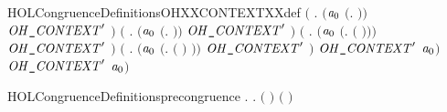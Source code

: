 \begin{SaveVerbatim}{HOLCongruenceDefinitionsOHXXCONTEXTXXdef}
                 \ensuremath{(}\HOLSymConst{\HOLTokenExists{}} . \ensuremath{(}\ensuremath{\HOLBoundVar{a}\sb{\mathrm{0}}} \HOLSymConst{\ensuremath{=}} \ensuremath{(}\HOLTokenLambda{}.   \HOLSymConst{\ensuremath{\mid}} \ensuremath{)}\ensuremath{)} \HOLSymConst{\HOLTokenConj{}} \ensuremath{\HOLBoundVar{OH\HOLTokenUnderscore{}CONTEXT}\sp{\prime}} \ensuremath{)} \HOLSymConst{\HOLTokenDisj{}}
                 \ensuremath{(}\HOLSymConst{\HOLTokenExists{}} . \ensuremath{(}\ensuremath{\HOLBoundVar{a}\sb{\mathrm{0}}} \HOLSymConst{\ensuremath{=}} \ensuremath{(}\HOLTokenLambda{}.  \HOLSymConst{\ensuremath{\mid}}  \ensuremath{)}\ensuremath{)} \HOLSymConst{\HOLTokenConj{}} \ensuremath{\HOLBoundVar{OH\HOLTokenUnderscore{}CONTEXT}\sp{\prime}} \ensuremath{)} \HOLSymConst{\HOLTokenDisj{}}
                 \ensuremath{(}\HOLSymConst{\HOLTokenExists{}} . \ensuremath{(}\ensuremath{\HOLBoundVar{a}\sb{\mathrm{0}}} \HOLSymConst{\ensuremath{=}} \ensuremath{(}\HOLTokenLambda{}.   \ensuremath{(} \ensuremath{)}\ensuremath{)}\ensuremath{)} \HOLSymConst{\HOLTokenConj{}} \ensuremath{\HOLBoundVar{OH\HOLTokenUnderscore{}CONTEXT}\sp{\prime}} \ensuremath{)} \HOLSymConst{\HOLTokenDisj{}}
                 \ensuremath{(}\HOLSymConst{\HOLTokenExists{}} .
                      \ensuremath{(}\ensuremath{\HOLBoundVar{a}\sb{\mathrm{0}}} \HOLSymConst{\ensuremath{=}} \ensuremath{(}\HOLTokenLambda{}.  \ensuremath{(} \ensuremath{)} \ensuremath{)}\ensuremath{)} \HOLSymConst{\HOLTokenConj{}}
                      \ensuremath{\HOLBoundVar{OH\HOLTokenUnderscore{}CONTEXT}\sp{\prime}} \ensuremath{)} \HOLSymConst{\HOLTokenImp{}}
                 \ensuremath{\HOLBoundVar{OH\HOLTokenUnderscore{}CONTEXT}\sp{\prime}} \ensuremath{\HOLBoundVar{a}\sb{\mathrm{0}}}\ensuremath{)} \HOLSymConst{\HOLTokenImp{}}
            \ensuremath{\HOLBoundVar{OH\HOLTokenUnderscore{}CONTEXT}\sp{\prime}} \ensuremath{\HOLBoundVar{a}\sb{\mathrm{0}}}\ensuremath{)}
\end{SaveVerbatim}
\newcommand{\HOLCongruenceDefinitionsOHXXCONTEXTXXdef}{\UseVerbatim{HOLCongruenceDefinitionsOHXXCONTEXTXXdef}}
\begin{SaveVerbatim}{HOLCongruenceDefinitionsprecongruence}
\HOLTokenTurnstile{} \HOLSymConst{\HOLTokenForall{}}.
         \HOLSymConst{\HOLTokenEquiv{}}
         \HOLSymConst{\HOLTokenConj{}}
       \HOLSymConst{\HOLTokenForall{}}  .   \HOLSymConst{\HOLTokenImp{}}    \HOLSymConst{\HOLTokenImp{}}  \ensuremath{(} \ensuremath{)} \ensuremath{(} \ensuremath{)}
\end{SaveVerbatim}
